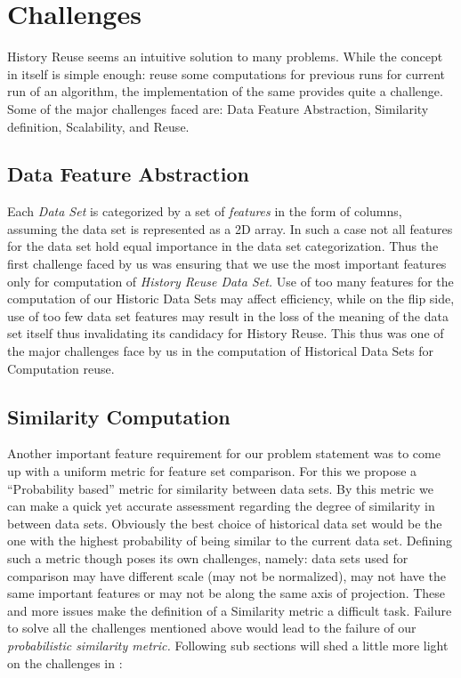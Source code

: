 \chapter{Challenges}
\label{chap-three}
History Reuse seems an intuitive solution to many problems. While the concept in itself is simple enough: reuse some computations for previous runs for current run of an algorithm, the implementation of the same provides quite a challenge. Some of the major challenges faced are: Data Feature Abstraction, Similarity definition, Scalability, and Reuse.
\section{Data Feature Abstraction}
Each \textit{Data Set} is categorized by a set of \textit{features} in the form of columns, assuming the data set is represented as a 2D array. In such a case not all features for the data set hold equal importance in the data set categorization. Thus the first challenge faced by us was ensuring that we use the most important features only for computation of \textit{History Reuse Data Set.} 
Use of too many features for the computation of our Historic Data Sets may affect efficiency, while on the flip side, use of too few data set features may result in the loss of the meaning of the data set itself thus invalidating its candidacy for History Reuse. This thus was one of the major challenges face by us in the computation of Historical Data Sets for Computation reuse.
\section{Similarity Computation}
Another important feature requirement for our problem statement was to come up with a uniform metric for feature set comparison. For this we propose a “Probability based” metric for similarity between data sets. By this metric we can make a quick yet accurate assessment regarding the degree of similarity in between data sets. Obviously the best choice of historical data set would be the one with the highest probability of being similar to the current data set.
Defining such a metric though poses its own challenges, namely: data sets used for comparison may have different scale (may not be normalized), may not have the same important features or may not be along the same axis of projection. These and more issues make the definition of a Similarity metric a difficult task. Failure to solve all the challenges mentioned above would lead to the failure of our \textit{probabilistic similarity metric.}
Following sub sections will shed a little more light on the challenges in :
